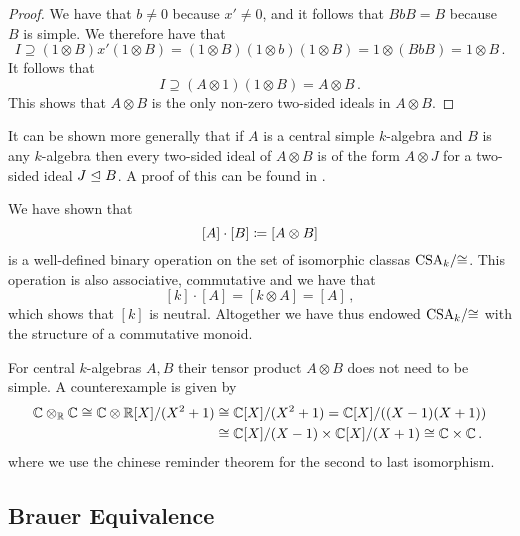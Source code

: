 \begin{proof}
  We have that $b \neq 0$ because $x' \neq 0$, and it follows that $BbB = B$ because $B$ is simple.
  We therefore have that
  \[
              I
    \supseteq (1 \otimes B) x' (1 \otimes B)
    =         (1 \otimes B) (1 \otimes b) (1 \otimes B)
    =         1 \otimes (BbB)
    =         1 \otimes B \,.
  \]
  It follows that
  \[
              I
    \supseteq (A \otimes 1) (1 \otimes B)
    =         A \otimes B \,.
  \]
  This shows that $A \otimes B$ is the only non-zero two-sided ideals in $A \otimes B$.
\end{proof}


\begin{remark}
  It can be shown more generally that if $A$ is a central simple $k$-algebra and $B$ is any $k$-algebra then every two-sided ideal of $A \otimes B$ is of the form $A \otimes J$ for a two-sided ideal $J \trianglelefteq B$.
  A proof of this can be found in \cite[Lemma~4.1]{Clark2012NonCA}.
\end{remark}


\begin{fluff}
  We have shown that
  \[
              [A] \cdot [B]
    \coloneqq  [A \otimes B]
  \]
  is a well-defined binary operation on the set of isomorphic classas $\operatorname{CSA}_k\!/{\cong}$.
  This operation is also associative, commutative and we have that
  \[
      [k] \cdot [A]
    = [k \otimes A]
    = [A] \,,
  \]
  which shows that $[k]$ is neutral.
  Altogether we have thus endowed $\operatorname{CSA}_k\!/{\cong}$ with the structure of a commutative monoid.
\end{fluff}


\begin{warning}
  For central $k$-algebras $A, B$ their tensor product $A \otimes B$ does not need to be simple.
  A counterexample is given by
  \begin{align*}
            \mathbb{C} \otimes_{\mathbb{R}} \mathbb{C}
     \cong  \mathbb{C} \otimes \mathbb{R}[X]/(X^2 + 1)
    &\cong  \mathbb{C}[X]/(X^2 + 1)
     =      \mathbb{C}[X]/((X-1)(X+1))
    \\
    &\cong  \mathbb{C}[X]/(X-1) \times \mathbb{C}[X]/(X+1)
     \cong  \mathbb{C} \times \mathbb{C} \,.
  \end{align*}
  where we use the chinese reminder theorem for the second to last isomorphism.
\end{warning}





\subsection{Brauer Equivalence}


